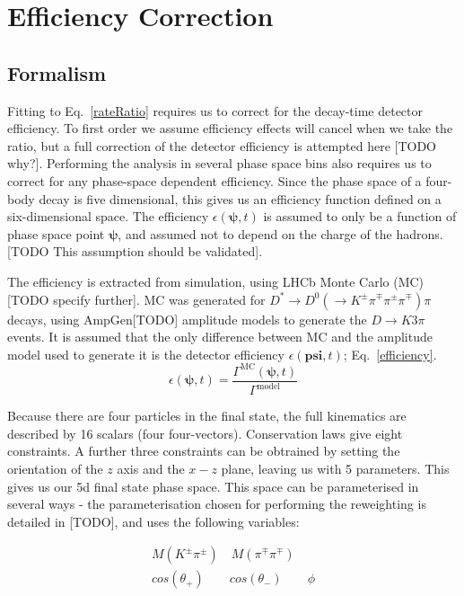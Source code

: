 \documentclass[note.tex]{subfiles}
\begin{document}
\section{Efficiency Correction}
\subsection{Formalism}
Fitting to Eq.~\ref{rateRatio} requires us to correct for the decay-time detector efficiency.
To first order we assume efficiency effects will cancel when we take the ratio, but a full correction of the detector efficiency is attempted here [TODO why?].
Performing the analysis in several phase space bins also requires us to correct for any phase-space dependent efficiency.
Since the phase space of a four-body decay is five dimensional, this gives us an efficiency function defined on a six-dimensional space.
The efficiency $\epsilon(\mathbf{\psi}, t)$ is assumed to only be a function of phase space point $\mathbf{\psi}$, and assumed not to depend on the charge of the hadrons.
[TODO This assumption should be validated].

The efficiency is extracted from simulation, using LHCb Monte Carlo (MC) [TODO specify further].
MC was generated for $D^* \rightarrow D^0(\rightarrow K^\pm \pi^\mp \pi^\pm \pi^\mp)\pi$ decays, using AmpGen[TODO] amplitude models to generate the $D\rightarrow K 3\pi$ events.
It is assumed that the only difference between MC and the amplitude model used to generate it is the detector efficiency $\epsilon(\mathbf{psi}, t)$; Eq.~\ref{efficiency}.
\begin{equation}
    \epsilon(\mathbf{\psi}, t) = \frac{\Gamma^{\mathrm{MC}}(\mathbf{\psi}, t)}{\Gamma^{\mathrm{model}}}
    \label{efficiency}
\end{equation}

Because there are four particles in the final state, the full kinematics are described by 16 scalars (four four-vectors).
Conservation laws give eight constraints.
A further three constraints can be obtrained by setting the orientation of the $z$ axis and the $x-z$ plane, leaving us with 5 parameters.
This gives us our 5d final state phase space.
This space can be parameterised in several ways - the parameterisation chosen for performing the reweighting is detailed in [TODO], and uses the following variables:

\begin{equation}
    \label{CM Parameterisation}
    \begin{aligned}
        M(K^\pm\pi^\pm)\quad
        M(\pi^\mp\pi^\mp)\\
        cos(\theta_+)\qquad
        cos(\theta_-)\qquad
        \phi
    \end{aligned}
\end{equation}
\end{document}

